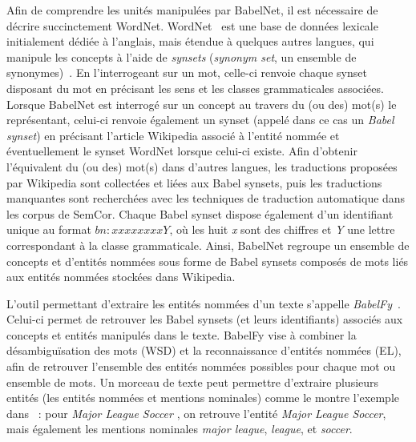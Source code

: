 Afin de comprendre les unités manipulées par BabelNet, il est nécessaire de décrire succinctement WordNet.
WordNet~\cite{miller1995wordnet} est une base de données lexicale initialement dédiée à l'anglais, mais étendue à quelques autres langues, qui manipule les concepts à l'aide de \textit{synsets} (\textit{synonym set}, un ensemble de synonymes)~\cite{navigli2012babelnet}.
En l'interrogeant sur un mot, celle-ci renvoie chaque synset disposant du mot en précisant les sens et les classes grammaticales associées.
Lorsque BabelNet est interrogé sur un concept au travers du (ou des) mot(s) le représentant, celui-ci renvoie également un synset (appelé dans ce cas un \textit{Babel synset}) en précisant l'article Wikipedia associé à l'entité nommée et éventuellement le synset WordNet lorsque celui-ci existe.
Afin d'obtenir l'équivalent du (ou des) mot(s) dans d'autres langues, les traductions proposées par Wikipedia sont collectées et liées aux Babel synsets, puis les traductions manquantes sont recherchées avec les techniques de traduction automatique dans les corpus de SemCor.
Chaque Babel synset dispose également d'un identifiant unique au format $bn{:}xxxxxxxxY$, où les huit \textit{x} sont des chiffres et \textit{Y} une lettre correspondant à la classe grammaticale.
Ainsi, BabelNet regroupe un ensemble de concepts et d'entités nommées sous forme de Babel synsets composés de mots liés aux entités nommées stockées dans Wikipedia.

\bigskip

L'outil permettant d'extraire les entités nommées d'un texte s'appelle \textit{BabelFy}~\cite{moro2014entity}\cite{moro2014multilingual}.
Celui-ci permet de retrouver les Babel synsets (et leurs identifiants) associés aux concepts et entités manipulés dans le texte.
BabelFy vise à combiner la désambiguïsation des mots (WSD) et la reconnaissance d'entités nommées (EL), afin de retrouver l'ensemble des entités nommées possibles pour chaque mot ou ensemble de mots.
Un morceau de texte peut permettre d'extraire plusieurs entités (les entités nommées et mentions nominales) comme le montre l'exemple dans~\cite{moro2014entity} : pour \og \textit{Major League Soccer} \fg, on retrouve l'entité \textit{Major League Soccer}, mais également les mentions nominales \textit{major league}, \textit{league}, et \textit{soccer}.

